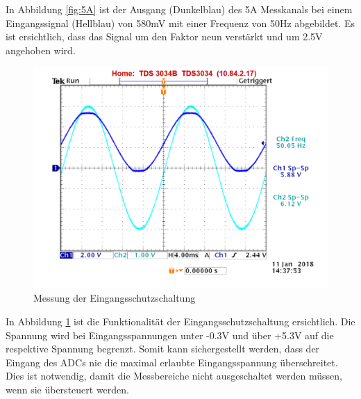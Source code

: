 In Abbildung \ref{fig:5A} ist der Ausgang (Dunkelblau) des 5A Messkanals bei einem Eingangssignal (Hellblau) von 580mV mit einer Frequenz von 50Hz abgebildet. Es ist ersichtlich, dass das Signal um den Faktor neun verstärkt und um 2.5V angehoben wird.

\begin{figure}[H]
	\includegraphics[width=140mm]{images/qualitatssicherung_U_5Vpp_50Hz.png}
	\caption{Messung der Eingangsschutzschaltung} %
	\label{fig:5V}
\end{figure}

In Abbildung \ref{fig:5V} ist die Funktionalität der Eingangsschutzschaltung ersichtlich. Die Spannung wird bei Eingangsspannungen unter -0.3V und über +5.3V auf die respektive Spannung begrenzt. Somit kann sichergestellt werden, dass der Eingang des ADCs nie die maximal erlaubte Eingangsspannung überschreitet. Dies ist notwendig, damit die Messbereiche nicht ausgeschaltet werden müssen, wenn sie übersteuert werden.

 